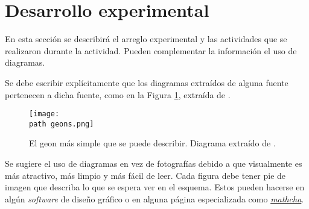 \section*{Desarrollo experimental}
\label{sec:Desarrollo}

En esta sección se describirá el arreglo experimental y las actividades que se realizaron durante la actividad. Pueden complementar la información el uso de diagramas.

Se debe escribir explícitamente que los diagramas extraídos de alguna fuente pertenecen a dicha fuente, como en la Figura \ref{fig:Geons}, extraída de \cite{wheeler1955}.

\begin{figure}[H]
	\centering
	\texttt{[image: \\path geons.png]}
	\caption{El geon más simple que se puede describir. Diagrama extraído de \cite{wheeler1955}.}
	\label{fig:Geons}
\end{figure}

Se sugiere el uso de diagramas en vez de fotografías debido a que visualmente es más atractivo, más limpio y más fácil de leer. Cada figura debe tener pie de imagen que describa lo que se espera ver en el esquema. Estos pueden hacerse en algún \textit{software} de diseño gráfico o en alguna página especializada como \href{https://www.mathcha.io/}{\textit{mathcha}}.